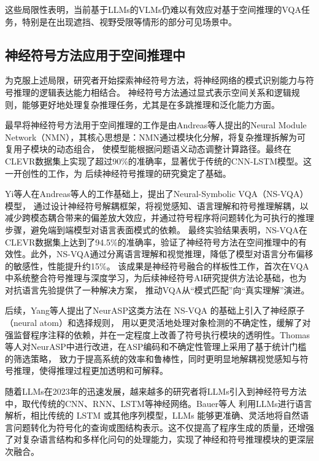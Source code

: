 这些局限性表明，当前基于LLMs的VLMs仍难以有效应对基于空间推理的VQA任务，特别是在出现遮挡、视野受限等情形的部分可见场景中。
\subsection{神经符号方法应用于空间推理中}
为克服上述局限，研究者开始探索神经符号方法，将神经网络的模式识别能力与符号推理的逻辑表达能力相结合。
神经符号方法通过显式表示空间关系和逻辑规则，能够更好地处理复杂推理任务，尤其是在多跳推理和泛化能力方面。

最早将神经符号方法用于空间推理的工作是由Andreas等人\cite{andreas2016neural}提出的Neural Module Network（NMN），其核心思想是：NMN通过模块化分解，将复杂推理拆解为可复用子模块的动态组合，
使模型能根据问题语义动态调整计算路径。最终在CLEVR数据集上实现了超过90\%的准确率，显著优于传统的CNN-LSTM模型。这一开创性的工作，为
后续神经符号推理的研究奠定了基础。

Yi等人\cite{yi2019neuralsymbolicvqadisentanglingreasoning}在Andreas等人的工作基础上，提出了Neural-Symbolic VQA（NS-VQA）模型，
通过设计神经符号解耦框架，将视觉感知、语言理解和符号推理解耦，以减少跨模态耦合带来的偏差放大效应，并通过符号程序将问题转化为可执行的推理步骤，避免端到端模型对语言表面模式的依赖。
最终实验结果表明，NS-VQA在CLEVR数据集上达到了94.5\%的准确率，验证了神经符号方法在空间推理中的有效性。此外，NS-VQA通过分离语言理解和视觉推理，降低了模型对语言分布偏移的敏感性，性能提升约15\%。
该成果是神经符号融合的样板性工作，首次在VQA中系统整合符号推理与深度学习，为后续神经符号AI研究提供方法论基础，也为对抗语言先验提供了一种解决方案，
推动VQA从“模式匹配”向“真实理解”演进。

后续，Yang等人\cite{yang2020neurasp}提出了NeurASP这类方法在 NS-VQA 的基础上引入了神经原子（neural atom）和选择规则，
用以更灵活地处理对象检测的不确定性，缓解了对强监督程序注释的依赖，并在一定程度上改善了符号执行模块的透明性。Thomas等人\cite{eiter2022neuro}对NeurASP中进行改进，在ASP编码和不确定性管理上采用了基于统计门槛的筛选策略，
致力于提高系统的效率和鲁棒性，同时更明显地解耦视觉感知与符号推理，使得推理过程更加透明和可解释。

随着LLMs在2023年的迅速发展，越来越多的研究者将LLMs引入到神经符号方法中，取代传统的CNN、RNN、LSTM等神经网络。Bauer\cite{bauer2023neuro}等人
利用LLMs进行语言解析，相比传统的 LSTM 或其他序列模型，LLMs 能够更准确、灵活地将自然语言问题转化为符号化的查询或图结构表示。这不仅提高了程序生成的质量，还增强了对复杂语言结构和多样化问句的处理能力，实现了神经和符号推理模块的更深层次融合。

